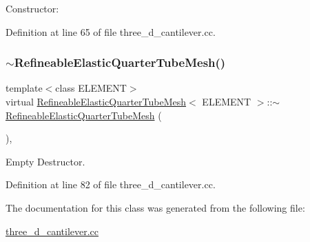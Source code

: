 Constructor\+: 



Definition at line 65 of file three\+\_\+d\+\_\+cantilever.\+cc.

\mbox{\label{classRefineableElasticQuarterTubeMesh_a157397dff3fb4ab8b1daea787bc9f97c}} 
\subsubsection{\texorpdfstring{$\sim$\+Refineable\+Elastic\+Quarter\+Tube\+Mesh()}{~RefineableElasticQuarterTubeMesh()}}
{\footnotesize\ttfamily template$<$class E\+L\+E\+M\+E\+NT$>$ \\
virtual \hyperlink{classRefineableElasticQuarterTubeMesh}{Refineable\+Elastic\+Quarter\+Tube\+Mesh}$<$ E\+L\+E\+M\+E\+NT $>$\+::$\sim$\hyperlink{classRefineableElasticQuarterTubeMesh}{Refineable\+Elastic\+Quarter\+Tube\+Mesh} (\begin{DoxyParamCaption}{ }\end{DoxyParamCaption})\hspace{0.3cm}{\ttfamily [inline]}, {\ttfamily [virtual]}}



Empty Destructor. 



Definition at line 82 of file three\+\_\+d\+\_\+cantilever.\+cc.



The documentation for this class was generated from the following file\+:\begin{DoxyCompactItemize}
\item 
\hyperlink{three__d__cantilever_8cc}{three\+\_\+d\+\_\+cantilever.\+cc}\end{DoxyCompactItemize}
